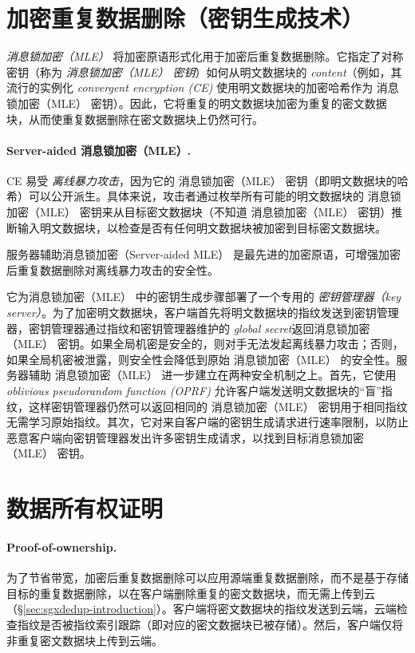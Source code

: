 \section{加密重复数据删除（密钥生成技术）}
\label{sec:background-encrypted-deduplication}

\textit{消息锁加密（MLE）} \cite{bellare2013MLE} 将加密原语形式化用于加密后重复数据删除。它指定了对称密钥（称为 \textit{ 消息锁加密（MLE） 密钥}）如何从明文数据块的 \textit{ content}（例如，其流行的实例化 \textit{ convergent encryption (CE)} \cite{douceur02}使用明文数据块的加密哈希作为 消息锁加密（MLE） 密钥）。因此，它将重复的明文数据块加密为重复的密文数据块，从而使重复数据删除在密文数据块上仍然可行。

\paragraph*{Server-aided 消息锁加密（MLE）.} CE 易受 \textit{ 离线暴力攻击}，因为它的 消息锁加密（MLE） 密钥（即明文数据块的哈希）可以公开派生。具体来说，攻击者通过枚举所有可能的明文数据块的 消息锁加密（MLE） 密钥来从目标密文数据块（不知道 消息锁加密（MLE） 密钥）推断输入明文数据块，以检查是否有任何明文数据块被加密到目标密文数据块。

服务器辅助消息锁加密（Server-aided MLE）\cite{bellare2013DupLESS} 是最先进的加密原语，可增强加密后重复数据删除对离线暴力攻击的安全性。

它为消息锁加密（MLE） 中的密钥生成步骤部署了一个专用的 \textit{ 密钥管理器（key server）}。为了加密明文数据块，客户端首先将明文数据块的指纹发送到密钥管理器，密钥管理器通过指纹和密钥管理器维护的\textit{ global secret}返回消息锁加密（MLE） 密钥。如果全局机密是安全的，则对手无法发起离线暴力攻击；否则，如果全局机密被泄露，则安全性会降低到原始 消息锁加密（MLE） 的安全性。服务器辅助 消息锁加密（MLE） 进一步建立在两种安全机制之上。首先，它使用 \textit{ oblivious pseudorandom function (OPRF)} \cite{naor2004Number} 允许客户端发送明文数据块的“盲”指纹，这样密钥管理器仍然可以返回相同的 消息锁加密（MLE） 密钥用于相同指纹无需学习原始指纹。其次，它对来自客户端的密钥生成请求进行速率限制，以防止恶意客户端向密钥管理器发出许多密钥生成请求，以找到目标消息锁加密（MLE） 密钥。

\section{数据所有权证明}
\label{sec:background-pow}

\paragraph*{Proof-of-ownership.} 为了节省带宽，加密后重复数据删除可以应用源端重复数据删除，而不是基于存储目标的重复数据删除，以在客户端删除重复的密文数据块，而无需上传到云（\S\ref{sec:sgxdedup-introduction}）。客户端将密文数据块的指纹发送到云端，云端检查指纹是否被指纹索引跟踪（即对应的密文数据块已被存储）。然后，客户端仅将非重复密文数据块上传到云端。


